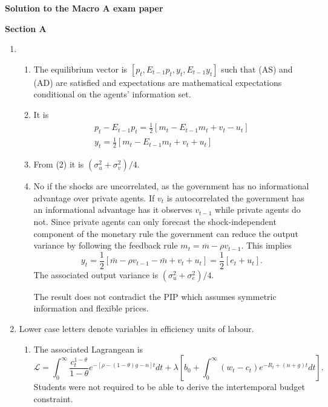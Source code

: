 \documentclass[12pt,a4]{article}
\begin{document}
\vspace{.5in}
\textbf{Solution to the Macro A exam paper }

\bigskip
\textbf {Section A}

\begin{enumerate}
\item
\begin{enumerate}
\item The equilibrium vector is
  $\left[p_{t},E_{t-1}p_{t},y_{t},E_{t-1}y_{t}\right]$ such that (AS)
  and (AD) are satisfied and expectations are mathematical
  expectations conditional on the agents' information set.
\item It is
  \begin{align}
    \label{eq:1}
    p_{t}-E_{t-1}p_{t}=\frac{1}{2}\left[m_{t}-E_{t-1}m_{t}+v_{t}-u_{t}\right]\\
y_{t}=\frac{1}{2}\left[m_{t}-E_{t-1}m_{t}+v_{t}+u_{t}\right]
  \end{align}

\item  From (2) it is $(\sigma^{2}_{u}+\sigma^{2}_{v})/4.$ 

\item  No if the shocks are uncorrelated, as the government has no
  informational advantage over private agents. If $v_{t}$ is
  autocorrelated the government has an informational advantage has it
  observes $v_{t-1}$ while private agents do not. Since private agents can only
  forecast the shock-independent component of the monetary rule the
  government can reduce the output variance by following the feedback rule
    $m_{t}=\overline{m}-\rho v_{t-1}.$  
This implies
\begin{equation}
  \label{eq:4}
  y_{t}=\frac{1}{2}\left[\bar{m}-\rho v_{t-1}-\bar{m}+v_{t}+u_{t}\right]=\frac{1}{2}\left[e_{t}+u_{t}\right].
\end{equation}
The associated output variance is $(\sigma^{2}_{u}+\sigma^{2}_{e})/4.$

The result does not contradict
  the PIP which assumes symmetric information and flexible prices.
\end{enumerate}
\item Lower case letters denote variables in efficiency units of
  labour. 
  \begin{enumerate}
  \item The associated Lagrangean is
\begin{equation}
  \label{eq:16}
 \mathcal{L}=\int^{\infty}_{0}\frac{c_{t}^{1-\theta}}{1-\theta}e^{-[\rho-(1-\theta)g-n]t}dt+\lambda \left[b_{0}+\int^{\infty}_{0}(w_{t}-c_{t})e^{-R_{t}+(n+g)t}dt\right].   
\end{equation}
Students were not required to be able to derive the intertemporal
budget constraint.


\end{enumerate}
\end{enumerate}
\end{document}
